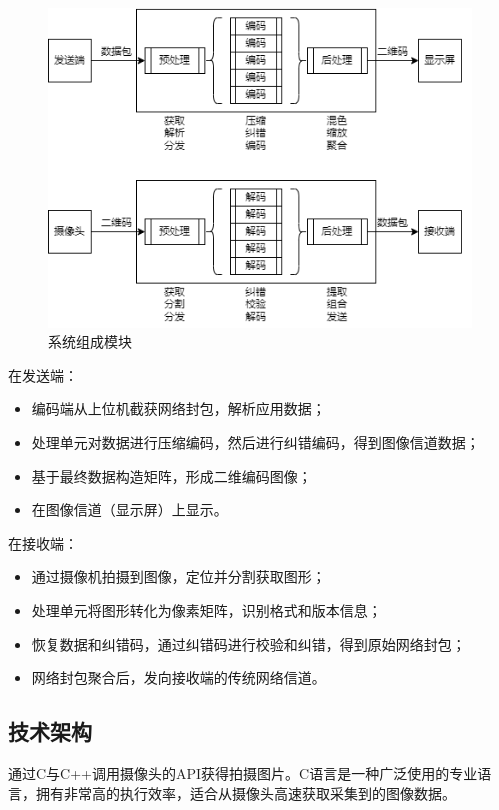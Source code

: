 \begin{figure}[!htbp]
\centering
\includegraphics[scale=1]{figures/SMapReduse.png}
\caption{系统组成模块}
\end{figure}

在发送端：
\begin{itemize}
\item 编码端从上位机截获网络封包，解析应用数据；
\item 处理单元对数据进行压缩编码，然后进行纠错编码，得到图像信道数据；
\item 基于最终数据构造矩阵，形成二维编码图像；
\item 在图像信道（显示屏）上显示。
\end{itemize}

在接收端：
\begin{itemize}
\item 通过摄像机拍摄到图像，定位并分割获取图形；
\item 处理单元将图形转化为像素矩阵，识别格式和版本信息；
\item 恢复数据和纠错码，通过纠错码进行校验和纠错，得到原始网络封包；
\item 网络封包聚合后，发向接收端的传统网络信道。
\end{itemize}

\subsection{技术架构}

通过C与C++调用摄像头的API获得拍摄图片。C语言是一种广泛使用的专业语言，拥有非常高的执行效率，适合从摄像头高速获取采集到的图像数据。

